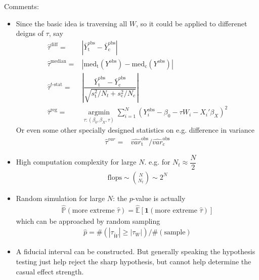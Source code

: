 Comments:
\begin{itemize}[topsep=2pt,itemsep=0pt]
    \item Since the basic idea is traversing all $ W $, so it could be applied to differenet deigns of $ \tau $, say 
    \begin{align}
        \hat{\tau}^\mathrm{diff}=&|\bar{Y}_\mathrm{t}^\mathrm{obs}-\bar{Y}_\mathrm{c}^\mathrm{obs}|\\
        \hat{\tau}^\mathrm{median}=&|\mathrm{med}_\mathrm{t}(Y^\mathrm{obs} )-\mathrm{med}_\mathrm{c}(Y^\mathrm{obs} )    |  \\
        \hat{\tau}^{t\text{-}\mathrm{stat} }=&\left\vert \dfrac{\bar{Y}_\mathrm{t}^\mathrm{obs}-\bar{Y}_\mathrm{c}^\mathrm{obs}}{\sqrt{ s_\mathrm{t}^2/N_t+s_\mathrm{c}^2/N_c   }} \right\vert \\
        \hat{\tau}^\mathrm{reg}=&\mathop{\arg\min}\limits_{\tau:(\beta _0,\beta _X,\tau)}\sum_{i=1}^N\left(Y_i^{\mathrm{obs}}-\beta _0-\tau W_i-X_i'\beta _X\right)^2  
    \end{align}
    Or even some other specially designed statistics on e.g. difference in variance
    \begin{align}
        \hat{\tau}^{var}=&\hat{var}^\mathrm{obs}_\mathrm{t} \big/\hat{var}^\mathrm{obs}_\mathrm{c}     
    \end{align}
    \item High computation complexity for large $ N $. e.g. for $ N_t\approx \dfrac{N}{2} $
    \begin{align}
        \mathrm{flops}\sim \binom{N}{N_t}\sim 2^N 
    \end{align}
    \item Random simulation for large $ N $: the $ p $-value is actually
    \begin{align}
        \hat{\mathbb{P}}\left( \text{more extreme }\hat{\tau} \right)=\hat{\mathbb{E}}\left[\mathbf{1}(\text{more extreme }\hat{\tau})\right] 
    \end{align}
    which can be approached by random sampling
    \begin{align}
        \hat{p}={\#(|\tau_{\tilde{W}}|\geq |\tau_{W}|)}\Big/{\#(\text{sample})}
   \end{align}
    \item A fiducial interval can be constructed. But generally speaking the hypothesis testing just help reject the sharp hypothesis, but cannot help determine the casual effect strength.
\end{itemize}

